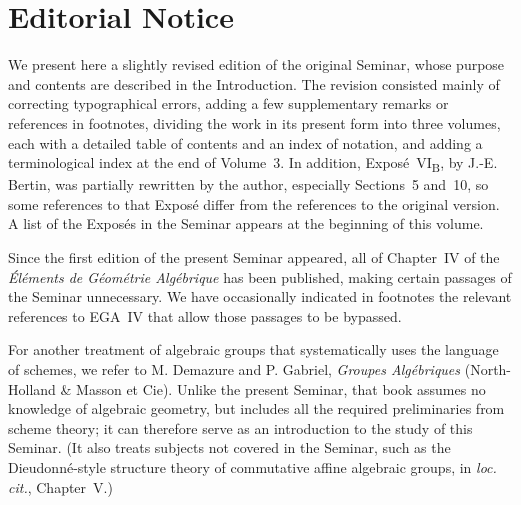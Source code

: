 
\begingroup
\newcommand{\SGAIIIIntroFootnote}[2]{%
  \begingroup
  \renewcommand{\thefootnote}{#1}%
  \footnote{#2}%
  \endgroup
}

\chapter*{Editorial Notice}

We present here a slightly revised edition of the original Seminar, whose purpose
and contents are described in the Introduction.  The revision consisted mainly of
correcting typographical errors, adding a few supplementary remarks or references
in footnotes, dividing the work in its present form into three volumes, each with a
detailed table of contents and an index of notation, and adding a terminological index at
the end of Volume~3.  In addition, Expos\'e~VI\textsubscript{B}, by J.-E. Bertin,
was partially rewritten by the author, especially Sections~5 and~10, so some
references to that Expos\'e differ from the references to the original version.  A
list of the Expos\'es in the Seminar appears at the beginning of this volume.

Since the first edition of the present Seminar appeared, all of Chapter~IV of the
\emph{\'El\'ements de G\'eom\'etrie Alg\'ebrique} has been published, making certain
passages of the Seminar unnecessary.  We have occasionally indicated in footnotes
the relevant references to EGA~IV that allow those passages to be bypassed.

For another treatment of algebraic groups that systematically uses the language of
schemes, we refer to M. Demazure and P. Gabriel, \emph{Groupes Alg\'ebriques}
(North-Holland \& Masson et Cie).  Unlike the present Seminar, that book assumes no
knowledge of algebraic geometry, but includes all the required preliminaries from
scheme theory; it can therefore serve as an introduction to the study of this
Seminar.  (It also treats subjects not covered in the Seminar, such as the
Dieudonn\'e-style structure theory of commutative affine algebraic groups, in
\emph{loc. cit.}, Chapter~V.)

